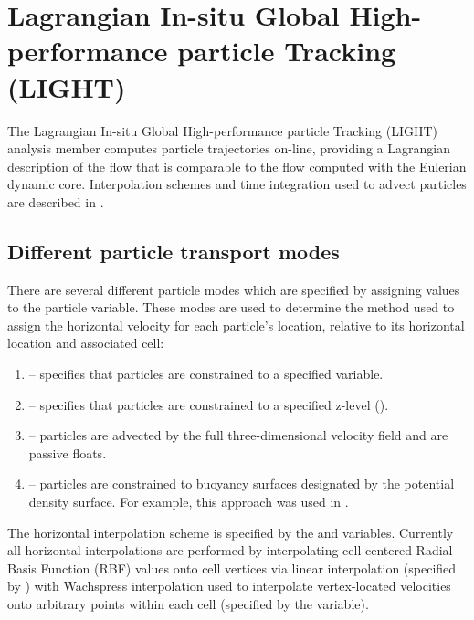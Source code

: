 \section{Lagrangian In-situ Global High-performance particle Tracking (LIGHT)}
\label{sec:LIGHT}

The Lagrangian In-situ Global High-performance particle Tracking (LIGHT) \citep{Wolfram_di15jpo}
analysis member computes particle trajectories on-line, providing a 
Lagrangian description of the flow that is comparable to the flow computed 
with the Eulerian dynamic core.  Interpolation schemes and time integration used to
advect particles are described in \citet{Wolfram_di15jpo}.  

\subsection{Different particle transport modes}

There are several different particle modes which are specified by assigning values to the  particle
variable.  These modes are used to determine the method used to assign the horizontal velocity for each particle's location,
relative to its horizontal location and associated cell:

\begin{enumerate}
  \item {} -- specifies that particles are constrained to a specified  variable.
  \item {} -- specifies that particles are constrained to a specified z-level ().
  \item {} -- particles are advected by the full three-dimensional velocity field and are passive floats.
  \item {} -- particles are constrained to buoyancy surfaces designated by the  potential density surface.  For example, this approach was used in \citet{Wolfram_di15jpo}.
\end{enumerate}

The horizontal interpolation scheme is specified by the
 and  variables. Currently
all horizontal interpolations are performed by interpolating cell-centered
Radial Basis Function (RBF) values onto cell vertices via linear interpolation
(specified by ) with Wachspress interpolation used to
interpolate vertex-located velocities onto arbitrary points within each cell
(specified by the  variable).  

